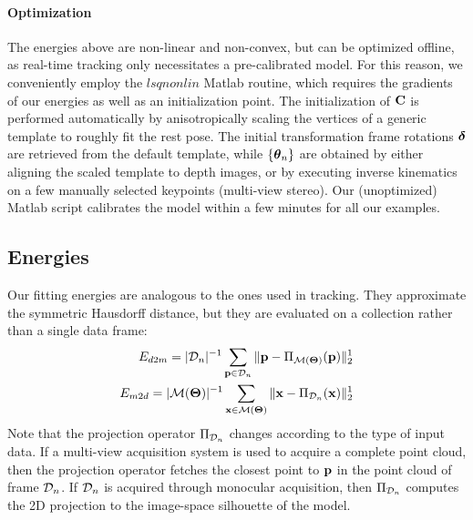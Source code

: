\paragraph{Optimization}
The energies above are non-linear and non-convex, but can be optimized offline, as real-time tracking only necessitates a pre-calibrated model. For this reason, we conveniently employ the $lsqnonlin$ Matlab routine, which requires the gradients of our energies as well as an initialization point.
The initialization of ${\mathbf{C}}$ is performed automatically by anisotropically scaling the vertices of a generic template to roughly fit the rest pose. The initial transformation frame rotations $\boldsymbol{\delta}$ are retrieved from the default template, while ${\{\boldsymbol{\theta}_n\}}$ are obtained by either aligning the scaled template to depth images, or by executing inverse kinematics on a few manually selected keypoints (multi-view stereo).
% 
% 
Our (unoptimized) Matlab script calibrates the model within a few minutes for all our examples.


\subsection{Energies}
Our fitting energies are analogous to the ones used in tracking. They approximate the symmetric Hausdorff distance, but they are evaluated on a collection rather than a single data frame:
% 
\begin{eqnarray}
E_{d2m} = |\mathcal{D}_n|^{-1} \sum_{\mathbf{p} \in \mathcal{D}_n} \| \mathbf{p} - \Pi_{\mathcal{M}(\boldsymbol{\Theta})}(\mathbf{p})\|_2^1 \\
E_{m2d} = |\mathcal{M}(\boldsymbol{\Theta})|^{-1} \sum_{\mathbf{x} \in \mathcal{M}(\boldsymbol{\Theta})} \| \mathbf{x} - \Pi_{\mathcal{D}_n}(\mathbf{x})\|_2^1
\end{eqnarray}
% 
Note that the projection operator $\Pi_{\mathcal{D}_n}$ changes according to the type of input data. If a multi-view acquisition system is used to acquire a complete point cloud, then the projection operator fetches the closest point to $\mathbf{p}$ in the point cloud of frame $\mathcal{D}_n$. If $\mathcal{D}_n$ is acquired through monocular acquisition, then $\Pi_{\mathcal{D}_n}$ computes the 2D projection to the image-space silhouette of the model.

